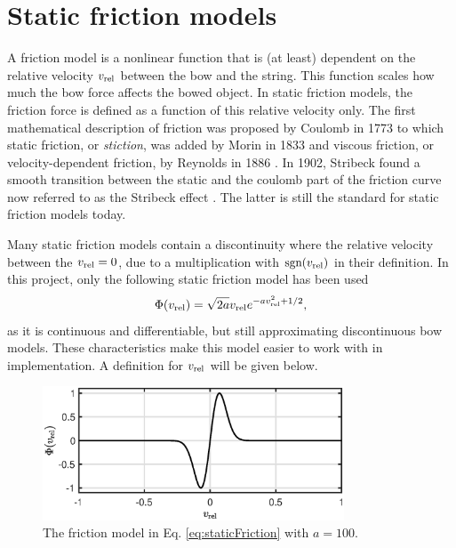 \section{Static friction models}\label{sec:staticFricMod}
A friction model is a nonlinear function that is (at least) dependent on the relative velocity $v_\text{rel}$ between the bow and the string. This function scales how much the bow force affects the bowed object. 
In static friction models, the friction force is defined as a function of this relative velocity only.
The first mathematical description of friction was proposed by Coulomb in 1773 \cite{Coulomb1773} to which static friction, or \textit{stiction}, was added by Morin in 1833 \cite{Morin1833} and viscous friction, or velocity-dependent friction, by Reynolds in 1886 \cite{Reynolds1886}. In 1902, Stribeck found a smooth transition between the static and the coulomb part of the friction curve now referred to as the Stribeck effect \cite{Stribeck1902}. The latter is still the standard for static friction models today.

Many static friction models contain a discontinuity where the relative velocity between the  $v_\text{rel} = 0$, due to a multiplication with $\text{sgn}(v_\text{rel})$ in their definition. In this project, only the following static friction model has been used \cite{theBible}
\begin{equation}\label{eq:staticFriction}
    \Phi (v_\text{rel}) = \sqrt{2a}v_\text{rel} e^{-av_\text{rel}^2 + 1/2},
\end{equation}
as it is continuous and differentiable, but still approximating discontinuous bow models. These characteristics make this model easier to work with in implementation. A definition for $v_\text{rel}$ will be given below.

\begin{figure}[h]
    \centering
    \includegraphics[width=0.8\textwidth]{figures/exciters/frictionCharacteristic.eps}
    \caption{The friction model in Eq. \eqref{eq:staticFriction} with $a = 100$. \label{fig:frictionCharacteristic}}
\end{figure}
